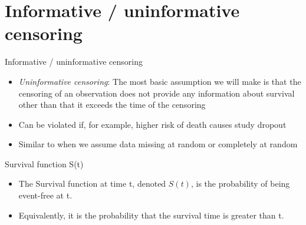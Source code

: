 \documentclass[
  ignorenonframetext,
]{beamer}
\providecommand{\tightlist}{%
  \setlength{\itemsep}{0pt}\setlength{\parskip}{0pt}}
\begin{document}
\hypertarget{informative-uninformative-censoring}{%
\section{Informative / uninformative
censoring}\label{informative-uninformative-censoring}}

\begin{frame}{Informative / uninformative censoring}

\begin{itemize}
\tightlist
\item
  \emph{Uninformative censoring}: The most basic assumption we will make
  is that the censoring of an observation does not provide any
  information about survival other than that it exceeds the time of the
  censoring
\item
  Can be violated if, for example, higher risk of death causes study
  dropout
\item
  Similar to when we assume data missing at random or completely at
  random
\end{itemize}

\end{frame}

\begin{frame}{Survival function S(t)}
\protect\hypertarget{survival-function-st}{}

\begin{itemize}
\tightlist
\item
  The Survival function at time t, denoted \(S(t)\), is the probability
  of being event-free at t.\\
\item
  Equivalently, it is the probability that the survival time is greater
  than t.
\end{itemize}

\end{frame}
\end{document}
